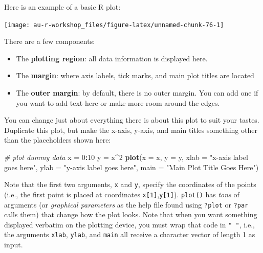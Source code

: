 \documentclass[]{book}
\newenvironment{Shaded}{\begin{snugshade}}{\end{snugshade}}
\newcommand{\CommentTok}[1]{\textcolor[rgb]{0.56,0.35,0.01}{\textit{#1}}}
\newcommand{\DataTypeTok}[1]{\textcolor[rgb]{0.13,0.29,0.53}{#1}}
\newcommand{\DecValTok}[1]{\textcolor[rgb]{0.00,0.00,0.81}{#1}}
\newcommand{\KeywordTok}[1]{\textcolor[rgb]{0.13,0.29,0.53}{\textbf{#1}}}
\newcommand{\NormalTok}[1]{#1}
\newcommand{\OperatorTok}[1]{\textcolor[rgb]{0.81,0.36,0.00}{\textbf{#1}}}
\newcommand{\StringTok}[1]{\textcolor[rgb]{0.31,0.60,0.02}{#1}}
\providecommand{\tightlist}{%
  \setlength{\itemsep}{0pt}\setlength{\parskip}{0pt}}
\begin{document}
Here is an example of a basic R plot:

\begin{center}\texttt{[image: au-r-workshop\_files/figure-latex/unnamed-chunk-76-1]} \end{center}

There are a few components:

\begin{itemize}
\tightlist
\item
  The \textbf{plotting region}: all data information is displayed here.
\item
  The \textbf{margin}: where axis labels, tick marks, and main plot titles are located
\item
  The \textbf{outer margin}: by default, there is no outer margin. You can add one if you want to add text here or make more room around the edges.
\end{itemize}

You can change just about everything there is about this plot to suit your tastes. Duplicate this plot, but make the x-axis, y-axis, and main titles something other than the placeholders shown here:

\begin{Shaded}
\begin{Highlighting}[]
\CommentTok{# plot dummy data}
\NormalTok{x =}\StringTok{ }\DecValTok{0}\OperatorTok{:}\DecValTok{10}
\NormalTok{y =}\StringTok{ }\NormalTok{x}\OperatorTok{^}\DecValTok{2}
\KeywordTok{plot}\NormalTok{(}\DataTypeTok{x =}\NormalTok{ x, }\DataTypeTok{y =}\NormalTok{ y,}
     \DataTypeTok{xlab =} \StringTok{"x-axis label goes here"}\NormalTok{, }
     \DataTypeTok{ylab =} \StringTok{"y-axis label goes here"}\NormalTok{,}
     \DataTypeTok{main =} \StringTok{"Main Plot Title Goes Here"}\NormalTok{)}
\end{Highlighting}
\end{Shaded}

Note that the first two arguments, \texttt{x} and \texttt{y}, specify the coordinates of the points (i.e., the first point is placed at coordinates \texttt{x{[}1{]}},\texttt{y{[}1{]}}). \texttt{plot()} has \emph{tons} of arguments (or \emph{graphical parameters} as the help file found using \texttt{?plot} or \texttt{?par} calls them) that change how the plot looks. Note that when you want something displayed verbatim on the plotting device, you must wrap that code in \texttt{"\ "}, i.e., the arguments \texttt{xlab}, \texttt{ylab}, and \texttt{main} all receive a character vector of length 1 as input.
\end{document}
